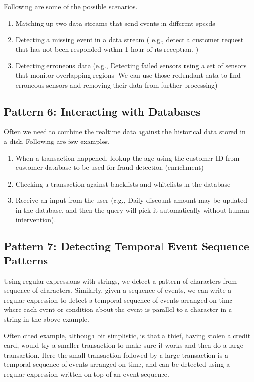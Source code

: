 \documentclass{sig-alternate}
\begin{document}
Following are some of the possible scenarios. 

\begin{enumerate}
\item Matching up two data streams that send events in different speeds 
\item  Detecting a missing event in a data stream ( e.g., detect a customer request that has not been responded within 1 hour of its reception. )
\item Detecting erroneous data (e.g., Detecting failed sensors using a set of sensors that monitor overlapping regions. We can use those redundant data to find erroneous sensors and removing their data from further processing) 
\end{enumerate}

\subsection{Pattern 6: Interacting with Databases}
Often we need to combine the realtime data against the historical data stored in a disk. 
Following are few examples. 
\begin{enumerate}
\item When a transaction happened, lookup the age using the customer ID from customer database to be used for fraud detection (enrichment) 
\item Checking a transaction against blacklists and whitelists in the database 
\item Receive an input from the user (e.g., Daily discount amount may be updated in the database, and then the query will pick it automatically without human intervention). 
\end{enumerate}


\subsection{Pattern 7: Detecting Temporal Event Sequence Patterns}
Using regular expressions with strings, we detect a pattern of characters from sequence of characters.  Similarly, given a sequence of events, we can write a regular expression to detect a temporal sequence of events arranged on time where each event or condition about the event is parallel to a character in a string in the above example. 

Often cited example, although bit simplistic,  is that a thief,  having stolen a credit card, would try a smaller transaction to make sure it works and then do a large transaction. Here the small transaction followed by a large transaction is a temporal sequence of events arranged on time, and can be detected using a regular expression written on top of an event sequence. 
\end{document}
